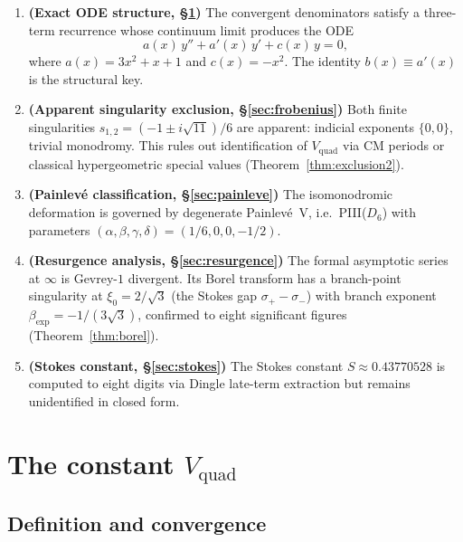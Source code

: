 \documentclass[11pt,a4paper]{article}
\theoremstyle{definition}
\theoremstyle{remark}
\newcommand{\Vq}{V_{\mathrm{quad}}}
\begin{document}
\begin{enumerate}
\item \textbf{(Exact ODE structure,
  \S\ref{sec:vquad})}
  The convergent denominators satisfy a
  three-term recurrence whose continuum
  limit produces the ODE
  \begin{equation}\label{eq:ode-intro}
    a(x)\,y'' + a'(x)\,y' + c(x)\,y = 0,
  \end{equation}
  where $a(x) = 3x^2+x+1$ and $c(x)=-x^2$.
  The identity $b(x) \equiv a'(x)$ is the
  structural key.

\item \textbf{(Apparent singularity exclusion,
  \S\ref{sec:frobenius})}
  Both finite singularities
  $s_{1,2} = (-1 \pm i\sqrt{11})/6$ are
  apparent: indicial exponents $\{0,0\}$,
  trivial monodromy. This rules out
  identification of $\Vq$ via CM periods or
  classical hypergeometric special values
  (Theorem~\ref{thm:exclusion2}).

\item \textbf{(Painlev\'e classification,
  \S\ref{sec:painleve})}
  The isomonodromic deformation is governed
  by degenerate Painlev\'e~V, i.e.\
  PIII($D_6$) with parameters
  $(\alpha,\beta,\gamma,\delta)
  = (1/6, 0, 0, -1/2)$.

\item \textbf{(Resurgence analysis,
  \S\ref{sec:resurgence})}
  The formal asymptotic series at $\infty$ is
  Gevrey-$1$ divergent. Its Borel transform
  has a branch-point singularity at
  $\xi_0 = 2/\sqrt{3}$ (the Stokes gap
  $\sigma_+ - \sigma_-$) with branch exponent
  $\beta_{\mathrm{exp}} = -1/(3\sqrt{3})$,
  confirmed to eight significant figures
  (Theorem~\ref{thm:borel}).

\item \textbf{(Stokes constant,
  \S\ref{sec:stokes})}
  The Stokes constant $S \approx 0.43770528$
  is computed to eight digits via
  Dingle late-term extraction but remains
  unidentified in closed form.
\end{enumerate}


\section{The constant $\Vq$}\label{sec:vquad}

\subsection{Definition and convergence}
\end{document}
